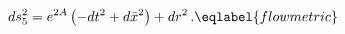 \begin{equation}
ds_5^2=e^{2 A} \left(-dt^2 +d\bar{x}^2\right)+dr^2\,.
\eqlabel{flowmetric}
\end{equation}


